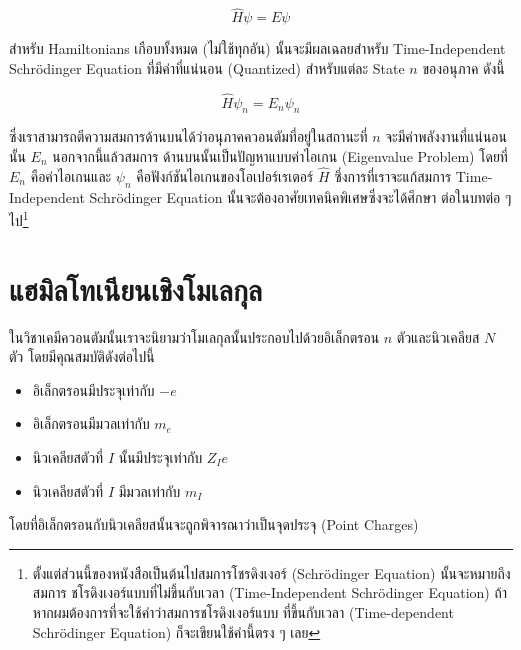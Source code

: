 \begin{equation}
  \label{eq:time_independent_schrodinger}
  \hat{H} \psi = E \psi
\end{equation}

สำหรับ Hamiltonians เกือบทั้งหมด (ไม่ใช้ทุกอัน) นั้นจะมีผลเฉลยสำหรับ Time-Independent Schr\"{o}dinger Equation ที่มีค่าที่แน่นอน
(Quantized) สำหรับแต่ละ State $n$ ของอนุภาค ดังนี้

\begin{equation}
  \hat{H} \psi_n = E_n \psi_n
\end{equation}

\noindent ซึ่งเราสามารถตีความสมการด้านบนได้ว่าอนุภาคควอนตัมที่อยู่ในสถานะที่ $n$ จะมีค่าพลังงานที่แน่นอนนั้น $E_n$ นอกจากนี้แล้วสมการ%
ด้านบนนั้นเป็นปัญหาแบบค่าไอเกน (Eigenvalue Problem) โดยที่ $E_n$ คือค่าไอเกนและ $\psi_n$ คือฟังก์ชันไอเกนของโอเปอร์เรเตอร์
$\hat{H}$ ซึ่งการที่เราจะแก้สมการ Time-Independent Schr\"{o}dinger Equation นั้นจะต้องอาศัยเทคนิคพิเศษซึ่งจะได้ศึกษา%
ต่อในบทต่อ ๆ ไป\footnote{ตั้งแต่ส่วนนี้ของหนังสือเป็นต้นไปสมการโชรดิงเงอร์ (Schr\"{o}dinger Equation) นั้นจะหมายถึงสมการ%
ชโรดิงเงอร์แบบที่ไม่ขึ้นกับเวลา (Time-Independent Schr\"{o}dinger Equation) ถ้าหากผมต้องการที่จะใช้คำว่าสมการชโรดิงเงอร์แบบ%
ที่ขึ้นกับเวลา (Time-dependent Schr\"{o}dinger Equation) ก็จะเขียนใช้คำนี้ตรง ๆ เลย}

\section{แฮมิลโทเนียนเชิงโมเลกุล}

ในวิชาเคมีควอนตัมนั้นเราจะนิยามว่าโมเลกุลนั้นประกอบไปด้วยอิเล็กตรอน $n$ ตัวและนิวเคลียส $N$ ตัว โดยมีคุณสมบัติดังต่อไปนี้

\begin{itemize}[topsep=0pt,noitemsep]
  \setlength\itemsep{1em}
  \item อิเล็กตรอนมีประจุเท่ากับ $-e$

  \item อิเล็กตรอนมีมวลเท่ากับ $m_e$

  \item นิวเคลียสตัวที่ $I$ นั้นมีประจุเท่ากับ $Z_I e$

  \item นิวเคลียสตัวที่ $I$ มีมวลเท่ากับ $m_I$
\end{itemize}

\noindent โดยที่อิเล็กตรอนกับนิวเคลียสนั้นจะถูกพิจารณาว่าเป็นจุดประจุ (Point Charges)

